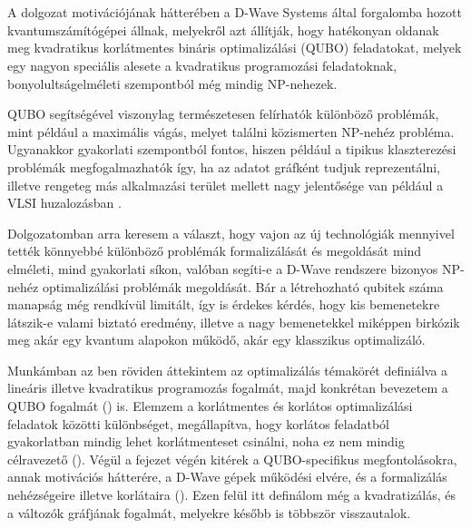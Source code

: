 
\chapter{\bevezetes}
A dolgozat motivációjának hátterében a D-Wave Systems által forgalomba hozott kvantumszámítógépei állnak, melyekről azt állítják, hogy hatékonyan oldanak meg kvadratikus korlátmentes bináris optimalizálási (QUBO) feladatokat, melyek egy nagyon speciális alesete a kvadratikus programozási feladatoknak, bonyolultságelméleti szempontból még mindig NP-nehezek. 

QUBO segítségével viszonylag természetesen felírhatók különböző problémák, mint például a maximális vágás, melyet találni közismerten NP-nehéz probléma. Ugyanakkor gyakorlati szempontból fontos, hiszen például a tipikus klaszterezési problémák megfogalmazhatók így, ha az adatot gráfként tudjuk reprezentálni, illetve rengeteg más alkalmazási terület mellett nagy jelentősége van például a VLSI huzalozásban \cite{wiki:VLSI}\cite{wiki:Maximum_cut}.

Dolgozatomban arra keresem a választ, hogy vajon az új technológiák mennyivel tették könnyebbé különböző problémák formalizálását és megoldását mind elméleti, mind gyakorlati síkon, valóban segíti-e a D-Wave rendszere bizonyos NP-nehéz optimalizálási problémák megoldását. Bár a létrehozható qubitek száma manapság még rendkívül limitált, így is érdekes kérdés, hogy kis bemenetekre látszik-e valami biztató eredmény, illetve a nagy bemenetekkel miképpen birkózik meg akár egy kvantum alapokon működő, akár egy klasszikus optimalizáló.

Munkámban az ben röviden áttekintem az optimalizálás témakörét definiálva a lineáris illetve kvadratikus programozás fogalmát, majd konkrétan bevezetem a QUBO fogalmát () is. Elemzem a korlátmentes és korlátos optimalizálási feladatok közötti különbséget, megállapítva, hogy korlátos feladatból gyakorlatban mindig lehet korlátmenteset csinálni, noha ez nem mindig célravezető ().
Végül a fejezet végén kitérek a QUBO-specifikus megfontolásokra, annak motivációs hátterére, a D-Wave gépek működési elvére, és a formalizálás nehézségeire illetve korlátaira (). Ezen felül itt definálom még a kvadratizálás, és a változók gráfjának fogalmát, melyekre később is többször visszautalok.


